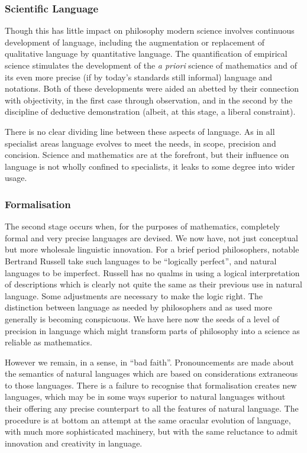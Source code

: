 \subsubsection{Scientific Language}

Though this has little impact on philosophy modern science involves continuous development of language, including the augmentation or replacement of qualitative language by quantitative language.
The quantification of empirical science stimulates the development of the {\it a priori} science of mathematics and of its even more precise (if by today's standards still informal) language and notations.
Both of these developments were aided an abetted by their connection with objectivity, in the first case through observation, and in the second by the discipline of deductive demonstration (albeit, at this stage, a liberal constraint).

There is no clear dividing line between these aspects of language.
As in all specialist areas language evolves to meet the needs, in scope, precision and concision.
Science and mathematics are at the forefront, but their influence on language is not wholly confined to specialists, it leaks to some degree into wider usage.

\subsubsection{Formalisation}

The second stage occurs when, for the purposes of mathematics, completely formal and very precise languages are devised.
We now have, not just conceptual but more wholesale linguistic innovation.
For a brief period philosophers, notable Bertrand Russell take such languages to be ``logically perfect'', and natural languages to be imperfect.
Russell has no qualms in using a logical interpretation of descriptions which is clearly not quite the same as their previous use in natural language.
Some adjustments are necessary to make the logic right.
The distinction between language as needed by philosophers and as used more generally is becoming conspicuous.
We have here now the seeds of a level of precision in language which might transform parts of philosophy into a science as reliable as mathematics.

However we remain, in a sense, in ``bad faith''.
Pronouncements are made about the semantics of natural languages which are based on considerations extraneous to those languages.
There is a failure to recognise that formalisation creates new languages, which may be in some ways superior to natural languages without their offering any precise counterpart to all the features of natural language.
The procedure is at bottom an attempt at the same oracular evolution of language, with much more sophisticated machinery, but with the same reluctance to admit innovation and creativity in language.

